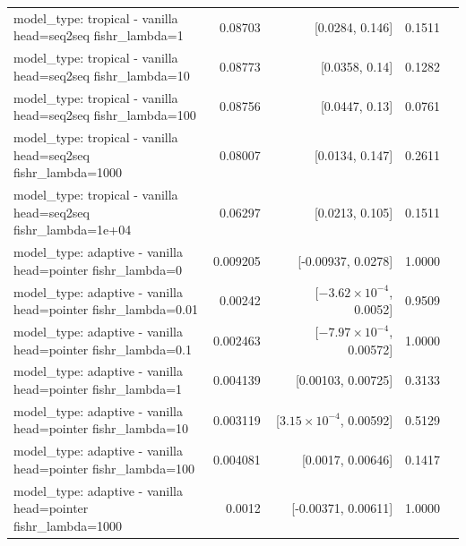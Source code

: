 \documentclass[10pt]{article}
\makeatletter
\newcommand{\stackcell}[1]{\begin{tabular}[t]{@{}l@{}}#1\end{tabular}}
\makeatother
\begin{document}
{\begin{longtable}{lrrrl}
\stackcell{model\_type: tropical - vanilla\\\footnotesize head=seq2seq fishr\_lambda=1 } & 0.08703 & [0.0284, 0.146] & 0.1511 & \\
\stackcell{model\_type: tropical - vanilla\\\footnotesize head=seq2seq fishr\_lambda=10 } & 0.08773 & [0.0358, 0.14] & 0.1282 & \\
\stackcell{model\_type: tropical - vanilla\\\footnotesize head=seq2seq fishr\_lambda=100 } & 0.08756 & [0.0447, 0.13] & 0.0761 & \\
\stackcell{model\_type: tropical - vanilla\\\footnotesize head=seq2seq fishr\_lambda=1000 } & 0.08007 & [0.0134, 0.147] & 0.2611 & \\
\stackcell{model\_type: tropical - vanilla\\\footnotesize head=seq2seq fishr\_lambda=1e+04 } & 0.06297 & [0.0213, 0.105] & 0.1511 & \\
\stackcell{model\_type: adaptive - vanilla\\\footnotesize head=pointer fishr\_lambda=0 } & 0.009205 & [-0.00937, 0.0278] & 1.0000 & \\
\stackcell{model\_type: adaptive - vanilla\\\footnotesize head=pointer fishr\_lambda=0.01 } & 0.00242 & [$-3.62\times10^{-4}$, 0.0052] & 0.9509 & \\
\stackcell{model\_type: adaptive - vanilla\\\footnotesize head=pointer fishr\_lambda=0.1 } & 0.002463 & [$-7.97\times10^{-4}$, 0.00572] & 1.0000 & \\
\stackcell{model\_type: adaptive - vanilla\\\footnotesize head=pointer fishr\_lambda=1 } & 0.004139 & [0.00103, 0.00725] & 0.3133 & \\
\stackcell{model\_type: adaptive - vanilla\\\footnotesize head=pointer fishr\_lambda=10 } & 0.003119 & [$3.15\times10^{-4}$, 0.00592] & 0.5129 & \\
\stackcell{model\_type: adaptive - vanilla\\\footnotesize head=pointer fishr\_lambda=100 } & 0.004081 & [0.0017, 0.00646] & 0.1417 & \\
\stackcell{model\_type: adaptive - vanilla\\\footnotesize head=pointer fishr\_lambda=1000 } & 0.0012 & [-0.00371, 0.00611] & 1.0000 & \\

\end{longtable}}
\end{document}
